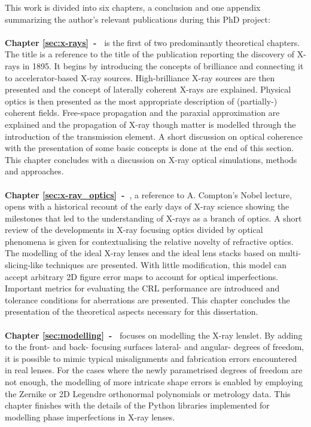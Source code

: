 This work is divided into six chapters, a conclusion and one appendix summarizing the author's relevant publications during this PhD project:
\\
\\
\textbf{Chapter \ref{sec:x-rays}~-~} is the first of two predominantly theoretical chapters. The title is a reference to the title of the publication reporting the discovery of X-rays in 1895. It begins by introducing the concepts of brilliance and connecting it to accelerator-based X-ray sources. High-brilliance X-ray sources are then presented and the concept of laterally coherent X-rays are explained. Physical optics is then presented as the most appropriate description of (partially-) coherent fields. Free-space propagation and the paraxial approximation are explained and the propagation of X-ray though matter is modelled through the introduction of the transmission element. A short discussion on optical coherence with the presentation of some basic concepts is done at the end of this section. This chapter concludes with a discussion on X-ray optical simulations, methods and approaches. 
\\
\\
\textbf{Chapter \ref{sec:x-ray_optics}~-~}, a reference to A. Compton's Nobel lecture, opens with a historical recount of the early days of X-ray science showing the milestones that led to the understanding of X-rays as a branch of optics. A short review of the developments in X-ray focusing optics divided by optical phenomena is given for contextualising the relative novelty of refractive optics. The modelling of the ideal X-ray lenses and the ideal lens stacks based on multi-slicing-like techniques are presented. With little modification, this model can accept arbitrary 2D figure error maps to account for optical imperfections. Important metrics for evaluating the CRL performance are introduced and tolerance conditions for aberrations are presented. This chapter concludes the presentation of the theoretical aspects necessary for this dissertation.
\\
\\
\textbf{Chapter \ref{sec:modelling}~-~} focuses on modelling the X-ray lenslet. By adding to the front- and back- focusing surfaces lateral- and angular- degrees of freedom, it is possible to mimic typical misalignments and fabrication errors encountered in real lenses. For the cases where the newly parametrised degrees of freedom are not enough, the modelling of more intricate shape errors is enabled by employing the Zernike or 2D Legendre orthonormal polynomials or metrology data. This chapter finishes with the details of the Python libraries implemented for modelling phase imperfections in X-ray lenses.
